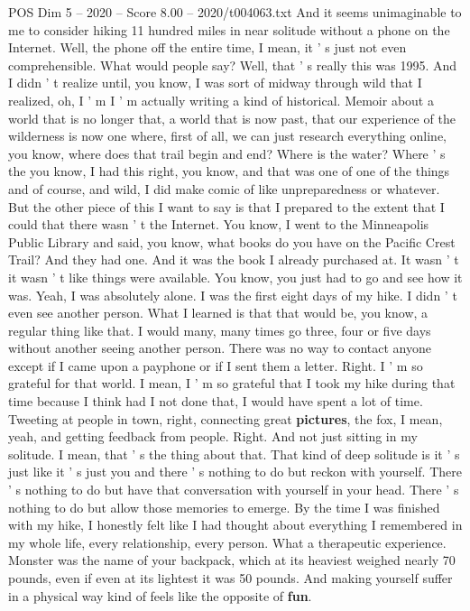 \begin{textsample}{POS Dim 5 – 2020 – Score 8.00 – 2020/t004063.txt}
And it seems unimaginable to me to consider hiking 11 hundred miles in near solitude without a phone on the Internet.
Well, the phone off the entire time, I mean, it ' s just not even comprehensible.
What would people say?
Well, that ' s really this was 1995.
And I didn ' t realize until, you know, I was sort of midway through wild that I realized, oh, I ' m I ' m actually writing a kind of historical.
Memoir about a world that is no longer that, a world that is now past, that our experience of the wilderness is now one where, first of all, we can just research everything online, you know, where does that trail begin and end?
Where is the water?
Where ' s the you know, I had this right, you know, and that was one of one of the things and of course, and wild, I did make comic of like unpreparedness or whatever.
But the other piece of this I want to say is that I prepared to the extent that I could that there wasn ' t the Internet.
You know, I went to the Minneapolis Public Library and said, you know, what books do you have on the Pacific Crest Trail?
And they had one.
And it was the book I already purchased at.
It wasn ' t it wasn ' t like things were available.
You know, you just had to go and see how it was.
Yeah, I was absolutely alone.
I was the first eight days of my hike.
I didn ' t even see another person.
What I learned is that that would be, you know, a regular thing like that.
I would many, many times go three, four or five days without another seeing another person.
There was no way to contact anyone except if I came upon a payphone or if I sent them a letter.
Right.
I ' m so grateful for that world.
I mean, I ' m so grateful that I took my hike during that time because I think had I not done that, I would have spent a lot of time.
Tweeting at people in town, right, connecting great \textbf{pictures}, the fox, I mean, yeah, and getting feedback from people.
Right.
And not just sitting in my solitude.
I mean, that ' s the thing about that.
That kind of deep solitude is it ' s just like it ' s just you and there ' s nothing to do but reckon with yourself.
There ' s nothing to do but have that conversation with yourself in your head.
There ' s nothing to do but allow those memories to emerge.
By the time I was finished with my hike, I honestly felt like I had thought about everything I remembered in my whole life, every relationship, every person.
What a therapeutic experience.
Monster was the name of your backpack, which at its heaviest weighed nearly 70 pounds, even if even at its lightest it was 50 pounds.
And making yourself suffer in a physical way kind of feels like the opposite of \textbf{fun}.

\end{textsample}
